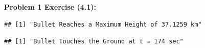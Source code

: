 \documentclass[11pt]{article}
\newenvironment{problem}[1]{\textbf{Problem #1: }}{\newpage}
\newenvironment{Shaded}{\begin{snugshade}}{\end{snugshade}}
\newcommand{\DecValTok}[1]{\textcolor[rgb]{0.00,0.00,0.81}{#1}}
\newcommand{\KeywordTok}[1]{\textcolor[rgb]{0.13,0.29,0.53}{\textbf{#1}}}
\newcommand{\NormalTok}[1]{#1}
\newcommand{\StringTok}[1]{\textcolor[rgb]{0.31,0.60,0.02}{#1}}
\begin{document}
\begin{problem}{1 Exercise (4.1)}
\begin{enumerate}[label = \textbf{Step \arabic*.}]
\begin{verbatim}
## [1] "Bullet Reaches a Maximum Height of 37.1259 km"
\end{verbatim}

\begin{Shaded}
\end{Shaded}

\begin{verbatim}
## [1] "Bullet Touches the Ground at t = 174 sec"
\end{verbatim}


\end{enumerate}
\end{problem}
\end{document}

